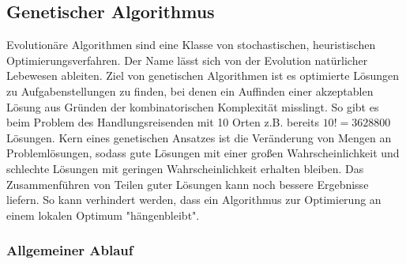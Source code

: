 \documentclass[11pt]{article}
\begin{document}
    \subsection{Genetischer Algorithmus}
    Evolutionäre Algorithmen sind eine Klasse von stochastischen, heuristischen
    Optimierungsverfahren. Der Name lässt sich von der Evolution natürlicher Lebewesen ableiten.
    Ziel von genetischen Algorithmen ist es optimierte Lösungen zu Aufgabenstellungen zu finden,
    bei denen ein Auffinden einer akzeptablen Lösung aus Gründen der kombinatorischen Komplexität
    misslingt. So gibt es beim Problem des Handlungsreisenden mit 10 Orten z.B. bereits
    $10!=3628800$ Lösungen. Kern eines genetischen Ansatzes ist die Veränderung von Mengen an
    Problemlösungen, sodass gute Lösungen mit einer großen Wahrscheinlichkeit und schlechte
    Lösungen mit geringen Wahrscheinlichkeit erhalten bleiben. Das Zusammenführen von Teilen guter
    Lösungen kann noch bessere Ergebnisse liefern. So kann verhindert werden, dass ein
    Algorithmus zur Optimierung an einem lokalen Optimum "hängenbleibt".

    \newpage

    \subsubsection{Allgemeiner Ablauf}
    \begin{center}
    \end{center}
\end{document}
